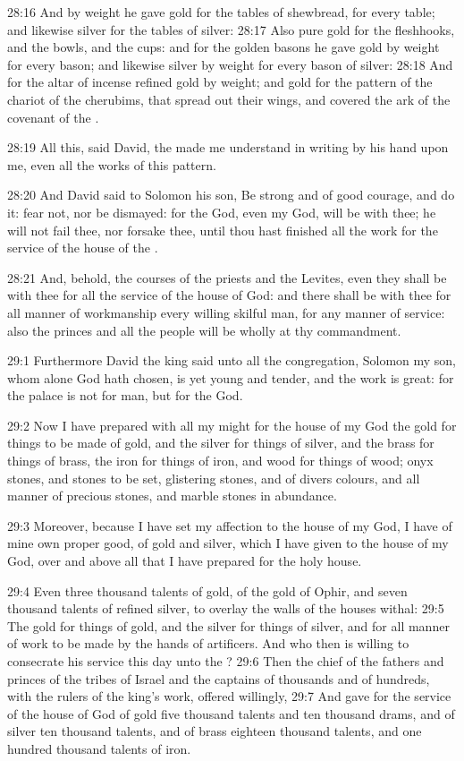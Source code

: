 28:16 And by weight he gave gold for the tables of shewbread, for every table; and likewise silver for the tables of silver: 28:17 Also pure gold for the fleshhooks, and the bowls, and the cups: and for the golden basons he gave gold by weight for every bason; and likewise silver by weight for every bason of silver: 28:18 And for the altar of incense refined gold by weight; and gold for the pattern of the chariot of the cherubims, that spread out their wings, and covered the ark of the covenant of the \LORD.

28:19 All this, said David, the \LORD made me understand in writing by his hand upon me, even all the works of this pattern.

28:20 And David said to Solomon his son, Be strong and of good courage, and do it: fear not, nor be dismayed: for the \LORD God, even my God, will be with thee; he will not fail thee, nor forsake thee, until thou hast finished all the work for the service of the house of the \LORD.

28:21 And, behold, the courses of the priests and the Levites, even they shall be with thee for all the service of the house of God: and there shall be with thee for all manner of workmanship every willing skilful man, for any manner of service: also the princes and all the people will be wholly at thy commandment.

29:1 Furthermore David the king said unto all the congregation, Solomon my son, whom alone God hath chosen, is yet young and tender, and the work is great: for the palace is not for man, but for the \LORD God.

29:2 Now I have prepared with all my might for the house of my God the gold for things to be made of gold, and the silver for things of silver, and the brass for things of brass, the iron for things of iron, and wood for things of wood; onyx stones, and stones to be set, glistering stones, and of divers colours, and all manner of precious stones, and marble stones in abundance.

29:3 Moreover, because I have set my affection to the house of my God, I have of mine own proper good, of gold and silver, which I have given to the house of my God, over and above all that I have prepared for the holy house.

29:4 Even three thousand talents of gold, of the gold of Ophir, and seven thousand talents of refined silver, to overlay the walls of the houses withal: 29:5 The gold for things of gold, and the silver for things of silver, and for all manner of work to be made by the hands of artificers. And who then is willing to consecrate his service this day unto the \LORD?  29:6 Then the chief of the fathers and princes of the tribes of Israel and the captains of thousands and of hundreds, with the rulers of the king's work, offered willingly, 29:7 And gave for the service of the house of God of gold five thousand talents and ten thousand drams, and of silver ten thousand talents, and of brass eighteen thousand talents, and one hundred thousand talents of iron.

